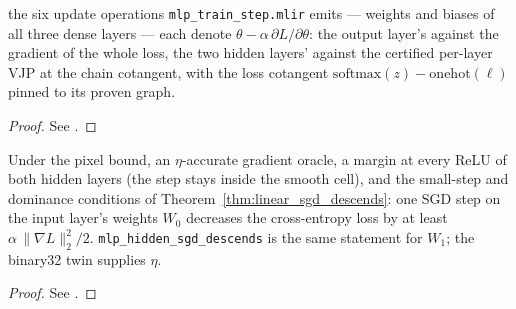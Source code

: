 
\begin{theorem}
  \label{thm:mlp_fold}
  \leanok
  \Prove{} the six update operations \texttt{mlp\_train\_step.mlir} emits
  --- weights and biases of all three dense layers --- each denote
  \(\theta - \alpha\,\partial L/\partial\theta\): the output layer's against the
  gradient of the whole loss, the two hidden layers' against the certified
  per-layer VJP at the chain cotangent, with the loss cotangent
  \(\mathrm{softmax}(z) - \mathrm{onehot}(\ell)\) pinned to its proven graph.
\end{theorem}

\begin{proof}
\leanok
See .
\end{proof}

\begin{theorem}
  \label{thm:mlp_sgd_descends}
  \leanok
  Under the pixel bound, an \(\eta\)-accurate gradient oracle, a margin at every
  ReLU of both hidden layers (the step stays inside the smooth cell), and the
  small-step and dominance conditions of Theorem~\ref{thm:linear_sgd_descends}:
  \Prove{} one SGD step on the input layer's weights \(W_0\) decreases the
  cross-entropy loss by at least \(\alpha\,\|\nabla L\|_2^2/2\).
  \texttt{mlp\_hidden\_sgd\_descends} is the same statement for \(W_1\); the
  binary32 twin supplies \(\eta\).
\end{theorem}

\begin{proof}
\leanok
See .
\end{proof}

